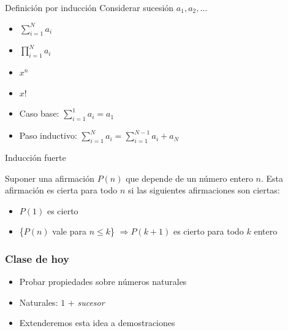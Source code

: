 \documentclass[14pt,aspectratio=169,xcolor=dvipsnames]{beamer}
\begin{document}
\begin{frame}{Definición por inducción}
    Considerar sucesión $a_1, a_2, \hdots$
    \begin{itemize}
        \item  $\sum_{i=1}^N a_i$
        \item $ \prod_{i=1}^N a_i$
        \item $x^n$
        \item $x!$
    \end{itemize}
    \pause
    \begin{center}
    \begin{minipage}{0.6\textwidth}
    \begin{block}{}
        \begin{itemize}
            \item Caso base: $\sum_{i=1}^1 a_i = a_1$
            \item Paso inductivo: $\sum_{i=1}^N a_i = \sum_{i=1}^{N-1} a_i + a_N$
        \end{itemize}
    \end{block}
    \end{minipage}
    \end{center}
\end{frame}
\begin{frame}{Inducción fuerte}
    \begin{block}{}
        Suponer una afirmación $P(n)$ que depende de un número entero $n$. Esta afirmación es cierta para todo $n$ si las siguientes afirmaciones son ciertas:
        \begin{itemize}
            \item $P(1)$ es cierto 
            \item \{$P(n)$ vale para $n\leq k$\} $\Rightarrow P(k+1)$ es cierto para todo $k$ entero
        \end{itemize}
    \end{block}

\end{frame}
\begin{frame}\frametitle{Clase de hoy}
    \begin{itemize}
        \item Probar propiedades sobre números naturales
        \item Naturales: $1$ + \emph{sucesor}
        \item Extenderemos esta idea a demostraciones
    \end{itemize}
\end{frame}
\begin{frame}
    \maketitle
\end{frame}
\end{document}

